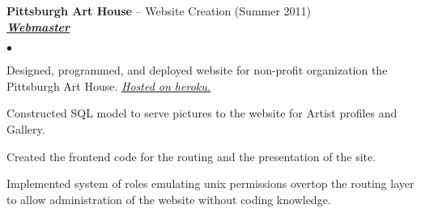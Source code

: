 \documentclass{article}
\newcommand{\employer}[4]{{ \textbf{#1} -- #2 (#3)\\ \underline{\textbf{\emph{#4}}}\\  }}
\newenvironment{achievements}{\begin{list}{$\bullet$}{\topsep 0pt \itemsep -2pt}}{\vspace*{4pt}\end{list}}
\begin{document}
\employer{Pittsburgh Art House}{Website Creation}{Summer 2011}{Webmaster}
   \begin{achievements}
     \item Designed, programmed, and deployed website for non-profit organization the Pittsburgh Art House. \emph{\href{http://pgharthouse.heroku.com}{Hosted on heroku.}}
       \item Constructed SQL model to serve pictures to the website for Artist profiles and Gallery.
         \item Created the frontend code for the routing and the presentation of the site.
           \item Implemented system of roles emulating unix permissions overtop the routing layer to allow administration of the website without coding knowledge.
             \end{achievements}
\end{document}
